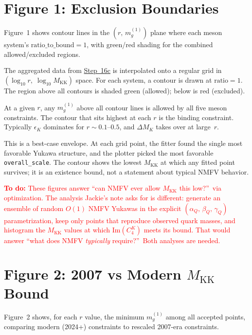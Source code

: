 \documentclass[11pt]{article}
\newcommand{\Mkk}{M_{\mathrm{KK}}}
\begin{document}
\section{Figure 1: Exclusion Boundaries}
\label{sec:step17}

Figure~1 shows contour lines in the $(r,\,m_g^{(1)})$ plane where each meson
system's $\text{ratio\_to\_bound} = 1$, with green/red shading for the combined
allowed/excluded regions.

The aggregated data from \hyperref[sec:step16c]{Step~16c} is interpolated onto a
regular grid in $(\log_{10} r,\;\log_{10} \Mkk)$ space.  For each system, a
contour is drawn at $\text{ratio} = 1$.  The region above all contours is shaded
green (allowed); below is red (excluded).

At a given $r$, any $m_g^{(1)}$ above all contour lines is allowed by all five
meson constraints.  The contour that sits highest at each $r$ is the binding
constraint.  Typically $\epsilon_K$ dominates for $r \sim 0.1$--$0.5$, and
$\Delta M_K$ takes over at large~$r$.

This is a best-case envelope.  At each grid point, the fitter found the single
most favorable Yukawa structure, and the plotter picked the most favorable
\texttt{overall\_scale}.  The contour shows the lowest $\Mkk$ at which any
fitted point survives; it is an existence bound, not a statement about typical
NMFV behavior.

\textcolor{red}{\textbf{To do:} These figures answer ``can NMFV ever allow
$\Mkk$ this low?''\ via optimization.  The analysis Jackie's note asks for is
different: generate an ensemble of random $O(1)$ NMFV Yukawas in the explicit
$(\alpha_Q,\,\beta_Q,\,\gamma_Q)$ parametrization, keep only points that
reproduce observed quark masses, and histogram the $\Mkk$ values at which
$\mathrm{Im}(C_4^K)$ meets its bound.  That would answer ``what does NMFV
\emph{typically} require?''\ Both analyses are needed.}

\section{Figure 2: 2007 vs Modern $\Mkk$ Bound}
\label{sec:step18}

Figure~2 shows, for each $r$ value, the minimum $m_g^{(1)}$ among all accepted
points, comparing modern (2024+) constraints to rescaled 2007-era constraints.
\end{document}
